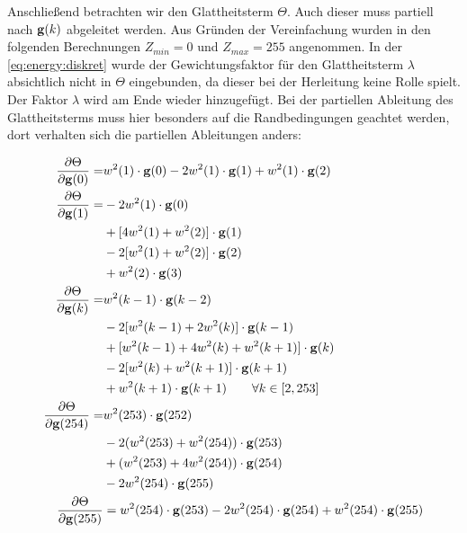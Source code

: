 Anschließend betrachten wir den Glattheitsterm $\Theta$. Auch dieser muss partiell nach $\mathbf g(k)$ abgeleitet werden. Aus Gründen der Vereinfachung wurden in den folgenden Berechnungen $Z_{min} = 0$ und $Z_{max} = 255$ angenommen. In der \autoref{eq:energy:diskret} wurde der Gewichtungsfaktor für den Glattheitsterm $\lambda$ absichtlich nicht in $\Theta$ eingebunden, da dieser bei der Herleitung keine Rolle spielt. Der Faktor $\lambda$ wird am Ende wieder hinzugefügt. Bei der partiellen Ableitung des Glattheitsterms muss hier besonders auf die Randbedingungen geachtet werden, dort verhalten sich die partiellen Ableitungen anders:


\begin{align}
\label{eq:partials:smoothness:0}
\frac{\partial \Theta}{\partial \mathbf g(0)} =& w^2(1)\cdot \mathbf g(0) -2w^2(1)\cdot \mathbf g(1) + w^2(1)\cdot \mathbf g(2)\\
\label{eq:partials:smoothness:1}
\frac{\partial \Theta}{\partial \mathbf g(1)} = &-2w^2(1)\cdot \mathbf g(0) \nonumber \\
        &+[4w^2(1)+w^2(2)]\cdot \mathbf g(1) \nonumber \\
        &- 2 [w^2(1)+w^2(2)]\cdot \mathbf g(2) \nonumber \\
        &+ w^2(2)\cdot \mathbf g(3) \\
\label{eq:partials:smoothness:k}
\frac{\partial \Theta}{\partial \mathbf g(k)} =& 
        w^2(k-1)\cdot \mathbf g(k-2)\nonumber\\
        &- 2[w^2(k-1)+2w^2(k)]\cdot \mathbf g(k-1) \nonumber\\
        &+ [w^2(k-1)+4w^2(k)+w^2(k+1)]\cdot \mathbf g(k)\nonumber\\ 
        &- 2[w^2(k)+w^2(k+1)] \cdot \mathbf g(k+1) \nonumber\\
        &+ w^2(k+1)\cdot \mathbf g(k+1) \qquad \forall k \in [2,253]\\
\label{eq:partials:smoothness:254}
\frac{\partial \Theta}{\partial \mathbf g(254)} =& w^2(253)\cdot \mathbf g(252) \nonumber \\
        & -2 (w^2(253)+w^2(254))\cdot \mathbf g(253) \nonumber \\
        & +(w^2(253)+4 w^2(254)) \cdot \mathbf g(254)\nonumber \\
        & -2 w^2(254)\cdot \mathbf g(255)\\
\label{eq:partials:smoothness:255}
\frac{\partial \Theta}{\partial \mathbf g(255)} &= 
    w^2(254)\cdot \mathbf g(253) 
    - 2 w^2(254)\cdot \mathbf g(254) 
    + w^2(254)\cdot \mathbf g(255)
\end{align}

